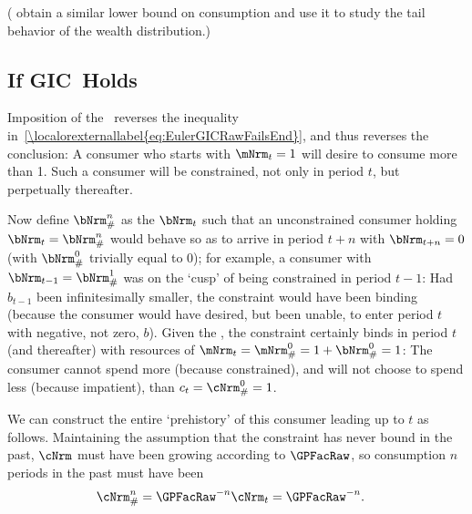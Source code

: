 \documentclass[\econtexRoot/BufferStockTheory]{subfiles}
\begin{document}
(\cite{StachurskiToda2019JET} obtain a similar lower bound on consumption and use it to study the tail behavior of the wealth distribution.)


\subsection{If {GIC}~Holds}

Imposition of the \GICRaw~reverses the inequality in~\eqref{\localorexternallabel{eq:EulerGICRawFailsEnd}}, and thus reverses the conclusion: A consumer who starts with $\mNrm_{t}=1$ will desire to consume more than 1.  Such a consumer will be constrained, not only in period $t$, but perpetually thereafter.

Now define $\bNrm_{\#}^{n}$ as the $\bNrm_{t}$ such that an unconstrained consumer holding $\bNrm_{t}=\bNrm_{\#}^{n}$ would behave so as to arrive in period $t+n$ with $\bNrm_{t+n}=0$ (with $\bNrm_{\#}^{0}$ trivially equal to 0); for example, a consumer with $\bNrm_{t-1}=\bNrm_{\#}^{1}$ was on the `cusp' of being constrained in period $t-1$: Had $b_{t-1}$ been infinitesimally smaller, the constraint would have been binding (because the consumer would have desired, but been unable, to enter period $t$ with negative, not zero, $b$).  Given
the \GICRaw, the constraint certainly binds in period $t$ (and thereafter) with resources of $\mNrm_{t}=\mNrm_{\#}^{0}=1+\bNrm_{\#}^{0}=1$: The consumer cannot spend more (because constrained), and will not choose to spend less (because impatient), than $c_{t}=\cNrm_{\#}^{0}=1$.

We can construct the entire `prehistory' of this consumer leading up to $t$ as follows.
Maintaining the assumption that the constraint has never bound in the past,
$\cNrm$ must have been growing according to $\GPFacRaw$, so consumption $n$ periods in the past must have been
\begin{equation}\begin{gathered}\begin{aligned}
  \cNrm_{\#}^{n}  & = \GPFacRaw^{-n} \cNrm_{t} = \GPFacRaw^{-n}. \label{eq:cPreHist}
\end{aligned}\end{gathered}\end{equation}
\end{document}
